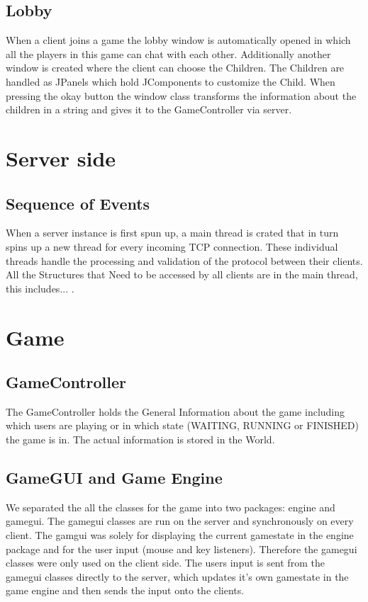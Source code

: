 \documentclass[11pt,a4paper]{article}
\begin{document}
		\subsection{Lobby}
		When a client joins a game the lobby window is automatically opened in which all the players in this game can chat with each other. Additionally another window is created where the client can choose the Children. The Children are handled as JPanels which hold JComponents to customize the Child. When pressing the okay button the window class transforms the information about the children in a string and gives it to the GameController via server.
		\subsection{} 
	\clearpage
	\section{Server side}
		\subsection{Sequence of Events}
		When a server instance is first spun up, a main thread is crated that in turn spins up a new thread for every incoming TCP connection. These individual threads handle the processing and validation of the protocol between their clients. All the Structures that Need to be accessed by all clients are in the main thread, this includes... . 
		\subsection{}
		\subsection{}
	\section{Game}
		\subsection{GameController}
		The GameController holds the General Information about the game including which users are playing or in which state (WAITING, RUNNING or FINISHED) the game is in. The actual information is stored in the World.
		\subsection{GameGUI and Game Engine}
		We separated the all the classes for the game into two packages: engine and gamegui. The gamegui classes are run on the server and synchronously on every client. The gamgui was solely for displaying the current gamestate in the engine package and for the user input (mouse and key listeners). Therefore the gamegui classes were only used on the client side. The users input is sent from the gamegui classes directly to the server, which updates it's own gamestate in the game engine and then sends the input onto the clients.
\end{document}
